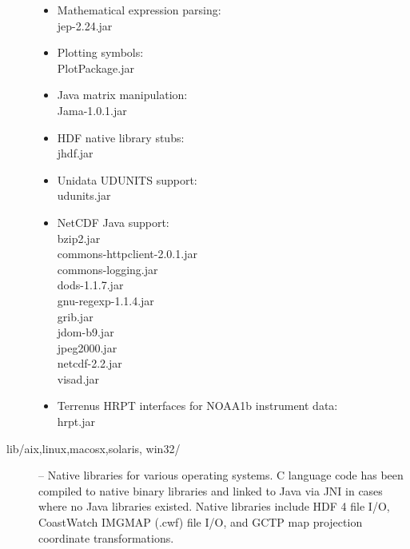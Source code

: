 \begin{description}
\begin{itemize}
\item Mathematical expression parsing:\\
{\file jep-2.24.jar}

\item Plotting symbols:\\
{\file PlotPackage.jar}

\item Java matrix manipulation:\\
{\file Jama-1.0.1.jar}

\item HDF native library stubs:\\
{\file jhdf.jar}

\item Unidata UDUNITS support:\\
{\file udunits.jar}

\item NetCDF Java support:\\
{\file bzip2.jar}\\
{\file commons-httpclient-2.0.1.jar}\\
{\file commons-logging.jar}\\
{\file dods-1.1.7.jar}\\
{\file gnu-regexp-1.1.4.jar}\\
{\file grib.jar}\\
{\file jdom-b9.jar}\\
{\file jpeg2000.jar}\\
{\file netcdf-2.2.jar}\\
{\file visad.jar}

\item Terrenus HRPT interfaces for NOAA1b instrument data:\\
{\file hrpt.jar}

\end{itemize}

\item[{\file lib/aix},{\file linux},{\file macosx},{\file solaris},{\file
win32}/] -- Native libraries for various operating systems.  C
language code has been compiled to native binary libraries and
linked to Java via JNI in cases where no Java libraries existed.
Native libraries include HDF 4 file I/O, CoastWatch IMGMAP (.cwf)
file I/O, and GCTP map projection coordinate transformations.

\end{description}

